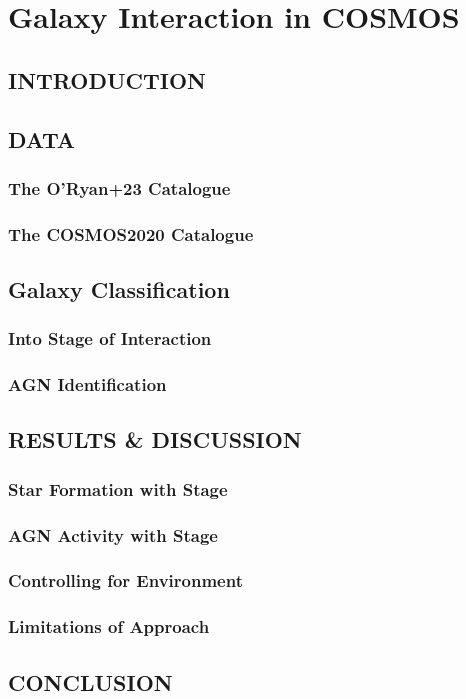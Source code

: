 \chapter{Galaxy Interaction in COSMOS}
\section{INTRODUCTION}
\section{DATA}
\subsection{The O'Ryan+23 Catalogue}
\subsection{The COSMOS2020 Catalogue}
\section{Galaxy Classification}
\subsection{Into Stage of Interaction}
\subsection{AGN Identification}
\section{RESULTS \& DISCUSSION}
\subsection{Star Formation with Stage}
\subsection{AGN Activity with Stage}
\subsection{Controlling for Environment}
\subsection{Limitations of Approach}
\section{CONCLUSION}
